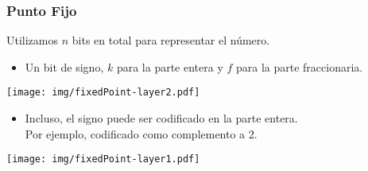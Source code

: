 \documentclass[aspectratio=169]{beamer}
\begin{document}
\begin{frame}[fragile]
    \frametitle{Punto Fijo}
    Utilizamos $n$ bits en total para representar el número.
    \begin{itemize}
    \item Un bit de signo, $k$ para la parte entera y $f$ para la parte fraccionaria.
    \end{itemize}
    \begin{center}
    \texttt{[image: img/fixedPoint-layer2.pdf]}
    \end{center}
    \begin{itemize}
     \item Incluso, el signo puede ser codificado en la parte entera.\\
     Por ejemplo, codificado como complemento a 2.
    \end{itemize}
    \begin{center}
    \texttt{[image: img/fixedPoint-layer1.pdf]}
    \end{center}
\end{frame}
\end{document}
